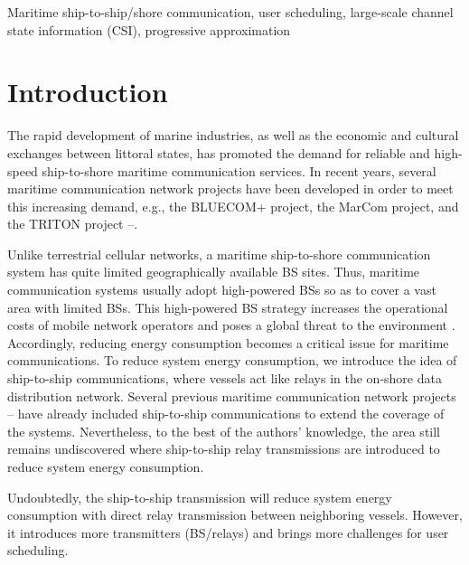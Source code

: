 \documentclass[conference]{IEEEtran}
\begin{document}
 \begin{IEEEkeywords}
 Maritime ship-to-ship/shore communication, user scheduling, large-scale channel state information (CSI), progressive approximation
 \end{IEEEkeywords}
 
 
 \maketitle
 
 \section{Introduction}\label{sec:1}

 The rapid development of marine industries, as well as the economic and cultural exchanges between littoral states, has promoted the demand for reliable and high-speed ship-to-shore maritime communication services. In recent years, several maritime communication network projects have been developed in order to meet this increasing demand, e.g., the BLUECOM+ project, the MarCom project, and the TRITON project \cite{p321}--\cite{p32}. 
 
 Unlike terrestrial cellular networks, a maritime ship-to-shore communication system has quite limited geographically available BS sites. Thus, maritime communication systems usually adopt high-powered BSs so as to cover a vast area with limited BSs. This high-powered BS strategy increases the operational costs of mobile network operators and poses a global threat to the environment \cite{p33}.
 Accordingly, reducing energy consumption becomes a critical issue for maritime communications. 
 To reduce system energy consumption, we introduce the idea of ship-to-ship communications, where vessels act like relays in the on-shore data distribution network. Several previous maritime communication network projects \cite{p321}--\cite{p32} have already included ship-to-ship communications to extend the coverage of the systems. Nevertheless, to the best of the authors' knowledge, the area still remains undiscovered where ship-to-ship relay transmissions are introduced to reduce system energy consumption. 

 Undoubtedly, the ship-to-ship transmission will reduce system energy consumption with direct relay transmission between neighboring vessels. 
 However, it introduces more transmitters (BS/relays) and brings more challenges for user scheduling. %
\end{document}
